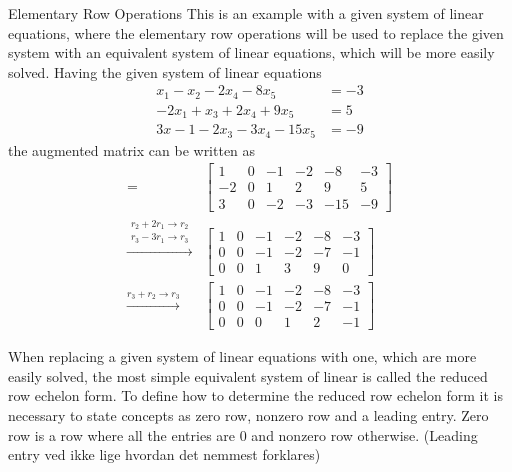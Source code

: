 \begin{example}{Elementary Row Operations}
This is an example with a given system of linear equations, where the  elementary row operations will be used to replace the given system with an equivalent system of linear equations, which will be more easily solved. Having the given system of linear equations
\begin{align*}
    x_1-x_2-2x_4-8x_5&=-3\\
    -2x_1+x_3+2x_4+9x_5 &= 5\\
    3x-1-2x_3-3x_4-15x_5&=-9
\end{align*}
the augmented matrix can be written as
\begin{align*}
[A \textbf{b}] =
	&\begin{bmatrix}
	1 & 0 & -1 &-2 & -8 & -3 \\
	-2 & 0 & 1 & 2 & 9 & 5 \\
	3 &0 & -2 & -3 & -15 & -9 
   \end{bmatrix} \\
  \xrightarrow{\substack{r_2+2r_1\rightarrow r_2\\  r_3-3r_1\rightarrow r_3}}
  &\begin{bmatrix}
 	 1 & 0 & -1 &-2 & -8 & -3 \\
 	 0 & 0 & -1 & -2 & -7 & -1 \\
	 0 &0 & 1 & 3 & 9 & 0
  \end{bmatrix}\\
  \xrightarrow{r_3+r_2\rightarrow r_3}
    &\begin{bmatrix}
  	 1 & 0 & -1 &-2 & -8 & -3 \\
 	 0 & 0 & -1 & -2 & -7 & -1 \\
	 0 &0 & 0 & 1 & 2 & -1
       \end{bmatrix}
\end{align*}
\label{exa:rowoperations}
\end{example}
When replacing a given system of linear equations with one, which are more easily solved, the most simple equivalent system of linear is called the reduced row echelon form. 
To define how to determine the reduced row echelon form it is necessary to state concepts as zero row, nonzero row and a leading entry. Zero row is a row where all the entries are 0 and nonzero row otherwise. (Leading entry ved ikke lige hvordan det nemmest forklares)
